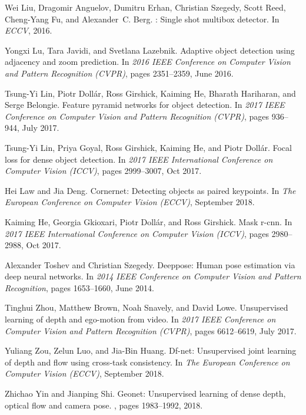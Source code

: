 \documentclass{article}
\begin{document}
{\begin{thebibliography}{10}
Wei Liu, Dragomir Anguelov, Dumitru Erhan, Christian Szegedy, Scott Reed,
  Cheng-Yang Fu, and Alexander~C. Berg.
: Single shot multibox detector.
\newblock In {\em ECCV}, 2016.

Yongxi Lu, Tara Javidi, and Svetlana Lazebnik.
\newblock Adaptive object detection using adjacency and zoom prediction.
\newblock In {\em 2016 IEEE Conference on Computer Vision and Pattern
  Recognition (CVPR)}, pages 2351--2359, June 2016.

Tsung-Yi Lin, Piotr Dollár, Ross Girshick, Kaiming He, Bharath Hariharan, and
  Serge Belongie.
\newblock Feature pyramid networks for object detection.
\newblock In {\em 2017 IEEE Conference on Computer Vision and Pattern
  Recognition (CVPR)}, pages 936--944, July 2017.

Tsung-Yi Lin, Priya Goyal, Ross Girshick, Kaiming He, and Piotr Dollár.
\newblock Focal loss for dense object detection.
\newblock In {\em 2017 IEEE International Conference on Computer Vision
  (ICCV)}, pages 2999--3007, Oct 2017.

Hei Law and Jia Deng.
\newblock Cornernet: Detecting objects as paired keypoints.
\newblock In {\em The European Conference on Computer Vision (ECCV)}, September
  2018.

Kaiming He, Georgia Gkioxari, Piotr Dollár, and Ross Girshick.
\newblock Mask r-cnn.
\newblock In {\em 2017 IEEE International Conference on Computer Vision
  (ICCV)}, pages 2980--2988, Oct 2017.

Alexander Toshev and Christian Szegedy.
\newblock Deeppose: Human pose estimation via deep neural networks.
\newblock In {\em 2014 IEEE Conference on Computer Vision and Pattern
  Recognition}, pages 1653--1660, June 2014.

Tinghui Zhou, Matthew Brown, Noah Snavely, and David Lowe.
\newblock Unsupervised learning of depth and ego-motion from video.
\newblock In {\em 2017 IEEE Conference on Computer Vision and Pattern
  Recognition (CVPR)}, pages 6612--6619, July 2017.

Yuliang Zou, Zelun Luo, and Jia-Bin Huang.
\newblock Df-net: Unsupervised joint learning of depth and flow using
  cross-task consistency.
\newblock In {\em The European Conference on Computer Vision (ECCV)}, September
  2018.

Zhichao Yin and Jianping Shi.
\newblock Geonet: Unsupervised learning of dense depth, optical flow and camera
  pose.
, pages 1983--1992, 2018.


\end{thebibliography}}
\end{document}
